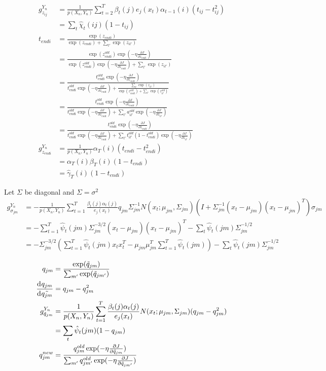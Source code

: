 \begin{align*}
g_{z_{ij}}^{Y_n} &= \frac{1}{p(X_n, Y_n)}\sum_{t = 2}^T\beta_t(j)e_j(x_t)\alpha_{t - 1}(i)(t_{ij} - t_{ij}^2)\\
&= \sum_t\hat{\chi}_t(ij)(1 - t_{ij}) \\
t_{endi} &= \frac{\exp(z_{endi})}{\exp(z_{endi}) + \sum_{l'}\exp(z_{il'})}\\
&= \frac{\exp(z^{old}_{endi})\exp(-\eta\frac{\partial J}{\partial z_{endi}})}{\exp(z^{old}_{endi})\exp(-\eta\frac{\partial J}{\partial z_{endi}}) + \sum_{l'}\exp(z_{il'})}\\
&= \frac{t^{old}_{endi}\exp(-\eta\frac{\partial J}{\partial z_{endi}})}{t^{old}_{endi}\exp(-\eta\frac{\partial J}{\partial z_{endi}}) + \frac{\sum_{l'}\exp(z_{il'})}{\exp(z^{old}_{endi}) + \sum_{l'}\exp(z^{old}_{il'})}}\\
&= \frac{t^{old}_{endi}\exp(-\eta\frac{\partial J}{\partial z_{endi}})}{t^{old}_{endi}\exp(-\eta\frac{\partial J}{\partial z_{endi}}) + \sum_{l'}a^{old}_{il'}\exp(-\eta\frac{\partial J}{\partial z_{il'}})}\\
&= \frac{t^{old}_{endi}\exp(-\eta\frac{\partial J}{\partial z_{endi}})}{t^{old}_{endi}\exp(-\eta\frac{\partial J}{\partial z_{endi}}) + \sum_{l'}t^{old}_{il'}(1 - t_{endi}^{old})\exp(-\eta\frac{\partial J}{\partial z_{il'}})}\\
g_{z_{endi}}^{Y_n} &= \frac{1}{p(X_n, Y_n)}\alpha_T(i)(t_{endi} - t_{endi}^2) \\
&= \alpha_T(i)\beta_T(i)(1 - t_{endi})\\
&= \hat{\gamma}_T(i)(1 - t_{endi})
\end{align*}

Let $\Sigma$ be diagonal and $\Sigma = \sigma^2$ 
\begin{align*}
g_{\sigma_{jm}}^{Y_n} &= -\frac{1}{p(X_n, Y_n)}\sum_{t = 1}^T\frac{\beta_t(j)\alpha_{t}(j)}{e_j(x_t)}q_{jm}\Sigma_{jm}^{-1}N(x_t; \mu_{jm}, \Sigma_{jm})(I + \Sigma_{jm}^{-1}(x_t-\mu_{jm})(x_t-\mu_{jm})^T)\sigma_{jm}\\
&= -\sum_{t = 1}^T\hat{\psi}_t(jm)\Sigma_{jm}^{-3/2}(x_t-\mu_{jm})(x_t-\mu_{jm})^T - \sum_t\hat{\psi}_t(jm)\Sigma_{jm}^{-1/2}\\
&=-\Sigma_{jm}^{-3/2}(\sum_{t = 1}^T\hat{\psi}_t(jm)x_tx_t^T - \mu_{jm}\mu_{jm}^T\sum_{t = 1}^T\hat{\psi}_t(jm)) - \sum_t\hat{\psi}_t(jm)\Sigma_{jm}^{-1/2}
\end{align*}

\begin{align*}
q_{jm} &= \frac{\exp(\tilde{q}_{jm})}{\sum_{m'} \exp(\tilde{q}_{jm'})}\\
\frac{\diff q_{jm}}{\diff \tilde{q_{jm}}} &= q_{jm} - q_{jm}^2 \\
g_{\tilde{q}_{jm}}^{Y_n} &= \frac{1}{p(X_n, Y_n)}\sum_{t = 1}^T\frac{\beta_t(j)\alpha_{t}(j)}{e_j(x_t)}N(x_t; \mu_{jm}, \Sigma_{jm})(q_{jm} - q_{jm}^2)\\
&=\sum_t \hat{\psi}_t(jm)(1 - q_{jm})\\
q_{jm}^{new} &= \frac{q_{jm}^{old}\exp(-\eta\frac{\partial J}{\partial \tilde{q}_{jm}})}{\sum_{m'} q_{jm'}^{old}\exp(-\eta\frac{\partial J}{\partial \tilde{q}_{jm'}})}
\end{align*}